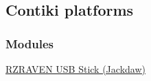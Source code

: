 \hypertarget{a00051}{\subsection{\-Contiki platforms}
\label{a00051}
}
\subsubsection*{\-Modules}
\begin{DoxyCompactItemize}
\item 
\hyperlink{a00053}{\-R\-Z\-R\-A\-V\-E\-N U\-S\-B Stick (\-Jackdaw)}
\end{DoxyCompactItemize}
